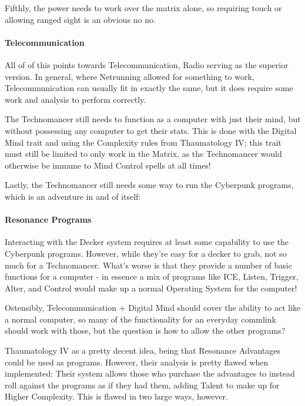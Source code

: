 \begin{multicols*}{2}
	Fifthly, the power needs to work over the matrix alone, so requiring touch or allowing ranged sight is an obvious no no.
	
	\paragraph{Telecommunication}
	
	All of of this points towards Telecommunication, Radio serving as the superior version. In general, where Netrunning allowed for something to work, Telecommunication can usually fit in exactly the same, but it does require some work and analysis to perform correctly. 
	
	The Technomancer still needs to function as a computer with just their mind, but without possessing any computer to get their stats. This is done with the Digital Mind trait and using the Complexity rules from Thaumatology IV; this trait must still be limited to only work in the Matrix, as the Technomancer would otherwise be immune to Mind Control spells at all times!
	
	Lastly, the Technomancer still needs some way to run the Cyberpunk programs, which is an adventure in and of itself:
	
	\paragraph{Resonance Programs}
	
	Interacting with the Decker system requires at least some capability to use the Cyberpunk programs. However, while they're easy for a decker to grab, not so much for a Technomancer. What's worse is that they provide a number of basic functions for a computer - in essence a mix of programs like ICE, Listen, Trigger, Alter, and Control would make up a normal Operating System for the computer!
	
	Ostensibly, Telecommunication + Digital Mind should cover the ability to act like a normal computer, so many of the functionality for an everyday commlink should work with those, but the question is how to allow the other programs?
	
	Thaumatology IV as a pretty decent idea, being that Resonance Advantages could be used as programs. However, their analysis is pretty flawed when implemented: Their system allows those who purchase the advantages to instead roll against the programs as if they had them, adding Talent to make up for Higher Complexity. This is flawed in two large ways, however.
	

\end{multicols*}
